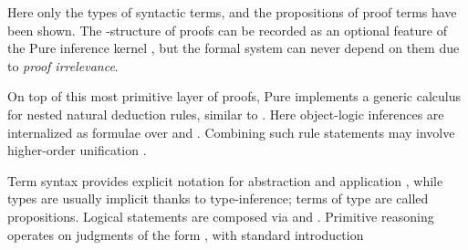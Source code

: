 \begin{isabellebody}
\begin{isamarkuptext}
  \noindent Here only the types of syntactic terms, and the
  propositions of proof terms have been shown.  The -structure of proofs can be recorded as an optional feature of
  the Pure inference kernel \cite{Berghofer-Nipkow:2000:TPHOL}, but
  the formal system can never depend on them due to \emph{proof
  irrelevance}.

  On top of this most primitive layer of proofs, Pure implements a
  generic calculus for nested natural deduction rules, similar to
  \cite{Schroeder-Heister:1984}.  Here object-logic inferences are
  internalized as formulae over  and .
  Combining such rule statements may involve higher-order unification
  \cite{paulson-natural}.%
\end{isamarkuptext}%
\isamarkuptrue%
%
\isamarkuptrue%
%
\begin{isamarkuptext}%
Term syntax provides explicit notation for abstraction  and application , while types are usually
  implicit thanks to type-inference; terms of type  are
  called propositions.  Logical statements are composed via  and .  Primitive reasoning operates on
  judgments of the form , with standard introduction

\end{isamarkuptext}
\end{isabellebody}
